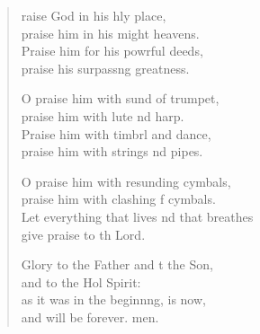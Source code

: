 \begin{verse}
  \begin{patverse}
raise God in his hly place,\Med\\
praise him in his might heavens.\\
Praise him for his powrful deeds,\Med\\
praise his surpass\pointup{\i}ng greatness.

O praise him with sund of trumpet,\Med\\
praise him with lute nd harp.\\
Praise him with timbrl and dance,\Med\\
praise him with strings nd pipes.

O praise him with resunding cymbals,\Med\\
praise him with clashing f cymbals.\\
Let everything that lives nd that breathes\Med\\
give praise to th Lord.

Glory to the Father and t the Son,\Med\\
and to the Hol Spirit:\\
as it was in the beginn\pointup{\i}ng, is now,\Med\\
and will be forever. men. 
  \end{patverse}
\end{verse}
